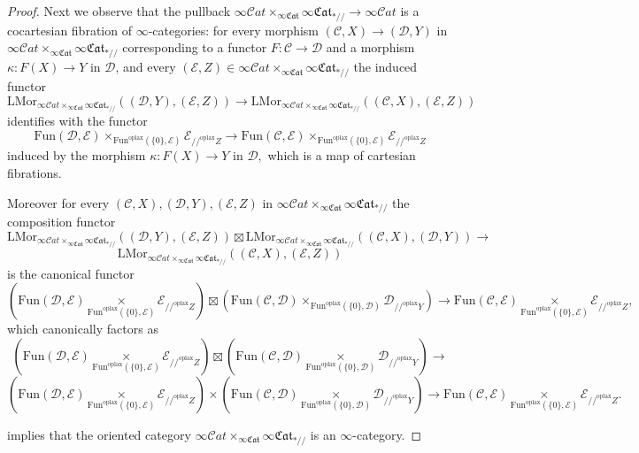 \documentclass[10pt,oneside]{article}
\numberwithin{equation}{section} %
\numberwithin{figure}{section} %
\theoremstyle{plain}
\theoremstyle{definition}
\newcommand{\bD}{{\mathbb D}}
\newcommand{\mC}{{\mathcal C}}
\newcommand{\mD}{{\mathcal D}}
\newcommand{\mE}{{\mathcal E}}
\newcommand{\Z}{Z}
\newcommand{\Fun}{\mathrm{Fun}}
\newcommand{\oplax}{{\mathrm{oplax}}}
\newcommand{\LMor}{\mathrm{LMor}}
\newcommand{\scat}{\mathcal{C}\mathit{at}}
\newcommand{\fcat}{\mathfrak{Cat}}
\begin{document}
\begin{proof}
Next we observe that the pullback $ \infty\scat \times_{\infty\fcat} \infty\fcat_{*//} \to \infty\scat$ is a cocartesian fibration of $\infty$-categories: for every morphism $(\mC,X) \to (\mD,Y)$ in
$\infty\scat \times_{\infty\fcat} \infty\fcat_{*//} $ 
corresponding to a functor $F:\mC \to \mD$ and a morphism
$\kappa: F(X) \to Y$ in $\mD$, and every $(\mE,\Z) \in \infty\scat \times_{\infty\fcat} \infty\fcat_{*//} $
the induced functor
$$\LMor_{\infty\scat \times_{\infty\fcat} \infty\fcat_{*//}}((\mD,Y),(\mE,Z)) \to \LMor_{\infty\scat \times_{\infty\fcat} \infty\fcat_{*//}}((\mC,X),(\mE,Z)) $$ 
identifies with the functor
$$ \Fun(\mD,\mE) \times_{\Fun^\oplax(\{0\},\mE)} \mE_{//^\oplax Z} \to \Fun(\mC,\mE) \times_{\Fun^\oplax(\{0\},\mE)} \mE_{//^\oplax Z} $$
induced by the morphism $\kappa: F(X) \to Y$ in $\mD,$ which is a map of cartesian fibrations.


Moreover for every $(\mC,X), (\mD,Y), (\mE,\Z)$ in
$\infty\scat \times_{\infty\fcat} \infty\fcat_{*//} $
the composition functor
$$ \LMor_{\infty\scat \times_{\infty\fcat} \infty\fcat_{*//}}((\mD,Y),(\mE,Z)) \boxtimes \LMor_{\infty\scat \times_{\infty\fcat} \infty\fcat_{*//}}((\mC,X),(\mD,Y)) \to $$$$ \LMor_{\infty\scat \times_{\infty\fcat} \infty\fcat_{*//}}((\mC,X),(\mE,Z)) $$
is the canonical functor
$$ (\Fun(\mD,\mE) \underset{\Fun^\oplax(\{0\},\mE)}{\times} \mE_{//^\oplax Z}) \boxtimes (\Fun(\mC,\mD) \times_{\Fun^\oplax(\{0\},\mD)} \mD_{//^\oplax Y}) \to \Fun(\mC,\mE) \underset{\Fun^\oplax(\{0\},\mE)}{\times} \mE_{//^\oplax Z}, $$
which canonically factors as
$$ (\Fun(\mD,\mE) \underset{\Fun^\oplax(\{0\},\mE)}{\times} \mE_{//^\oplax Z}) \boxtimes (\Fun(\mC,\mD) \underset{\Fun^\oplax(\{0\},\mD)}{\times} \mD_{//^\oplax Y}) \to $$$$ (\Fun(\mD,\mE) \underset{\Fun^\oplax(\{0\},\mE)}{\times}\mE_{//^\oplax Z}) \times (\Fun(\mC,\mD) \underset{\Fun^\oplax(\{0\},\mD)}{\times} \mD_{//^\oplax Y}) \to \Fun(\mC,\mE) \underset{\Fun^\oplax(\{0\},\mE)}{\times} \mE_{//^\oplax Z}.$$

\cite[Theorem 4.2.7.]{oriented} implies that the oriented category $ \infty\scat \times_{\infty\fcat} \infty\fcat_{*//} $ is an $\infty$-category.


\end{proof}
\end{document}
